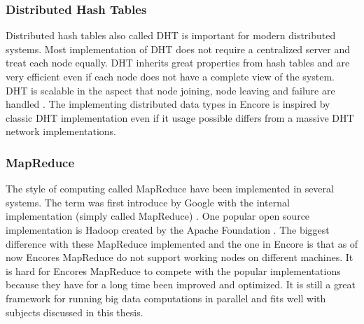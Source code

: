 \subsubsection{Distributed Hash Tables}
Distributed hash tables also called DHT is important for modern distributed systems. Most implementation of DHT does not require a centralized server and treat each node equally. DHT inherits great properties from hash tables and are very efficient even if each node does not have a complete view of the system. DHT is scalable in the aspect that node joining, node leaving and failure are handled \cite{DHT}. The implementing distributed data types in Encore is inspired by classic DHT implementation even if it usage possible differs from a massive DHT network implementations.

\subsubsection{MapReduce}
The style of computing called MapReduce have been implemented in several systems. The term was first introduce by Google with the internal implementation (simply called MapReduce) \cite{mining}. One popular open source implementation is Hadoop created by the Apache Foundation \cite{apgit}. The biggest difference with these MapReduce implemented and the one in Encore is that as of now Encores MapReduce do not support working nodes on different machines. It is hard for Encores MapReduce to compete with the popular implementations because they have for a long time been improved and optimized. It is still a great framework for running big data computations in parallel and fits well with subjects discussed in this thesis.